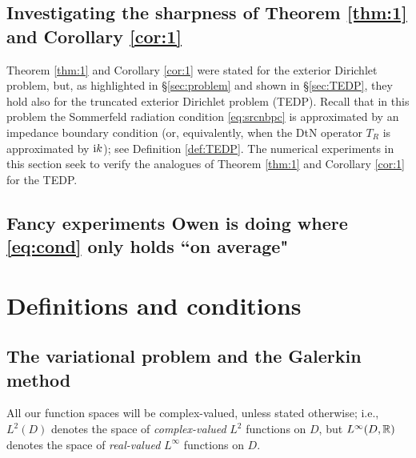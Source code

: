 \subsection{Investigating the sharpness of Theorem \ref{thm:1} and Corollary \ref{cor:1}}

Theorem \ref{thm:1} and Corollary \ref{cor:1} were stated for the exterior Dirichlet problem, but, as highlighted in \S\ref{sec:problem} and shown in \S\ref{sec:TEDP}, they hold also for the truncated exterior Dirichlet problem (TEDP). Recall that in this problem the Sommerfeld radiation condition \eqref{eq:srcnbpc} is approximated by an impedance boundary condition (or, equivalently, when the DtN operator $T_R$ is approximated by $\mathrm{i} k$); see Definition \ref{def:TEDP}. The numerical experiments in this section seek to verify the analogues of Theorem \ref{thm:1} and Corollary \ref{cor:1} for the TEDP.

\subsection{Fancy experiments Owen is doing where \eqref{eq:cond} only holds ``on average"}


\section{Definitions and conditions}\label{sec:3}

\subsection{The variational problem and the Galerkin method}\label{sec:vpGm}

All our function spaces will be complex-valued, unless stated otherwise; i.e., $L^2(D)$ denotes the space of \emph{complex-valued} $L^2$ functions on $D$, but $L^\infty(D,\mathbb R)$ denotes the space of \emph{real-valued} $L^\infty$ functions on $D$.



